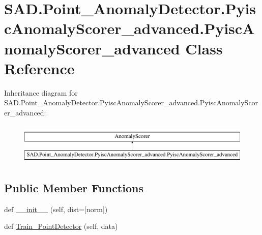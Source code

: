 \hypertarget{classSAD_1_1Point__AnomalyDetector_1_1PyiscAnomalyScorer__advanced_1_1PyiscAnomalyScorer__advanced}{}\section{S\+A\+D.\+Point\+\_\+\+Anomaly\+Detector.\+Pyisc\+Anomaly\+Scorer\+\_\+advanced.\+Pyisc\+Anomaly\+Scorer\+\_\+advanced Class Reference}
\label{classSAD_1_1Point__AnomalyDetector_1_1PyiscAnomalyScorer__advanced_1_1PyiscAnomalyScorer__advanced}
Inheritance diagram for S\+A\+D.\+Point\+\_\+\+Anomaly\+Detector.\+Pyisc\+Anomaly\+Scorer\+\_\+advanced.\+Pyisc\+Anomaly\+Scorer\+\_\+advanced\+:\begin{figure}[H]
\begin{center}
\leavevmode
\includegraphics[height=2.000000cm]{classSAD_1_1Point__AnomalyDetector_1_1PyiscAnomalyScorer__advanced_1_1PyiscAnomalyScorer__advanced}
\end{center}
\end{figure}
\subsection*{Public Member Functions}
\begin{DoxyCompactItemize}
\item 
def \hyperlink{classSAD_1_1Point__AnomalyDetector_1_1PyiscAnomalyScorer__advanced_1_1PyiscAnomalyScorer__advanced_a0f31a799a55ffef102c814a436661d10}{\+\_\+\+\_\+init\+\_\+\+\_\+} (self, dist=\mbox{[}\textquotesingle{}norm\textquotesingle{}\mbox{]})
\item 
def \hyperlink{classSAD_1_1Point__AnomalyDetector_1_1PyiscAnomalyScorer__advanced_1_1PyiscAnomalyScorer__advanced_aef70b902dc9c5df150eecd5c0b1c3916}{Train\+\_\+\+Point\+Detector} (self, data)
\end{DoxyCompactItemize}

